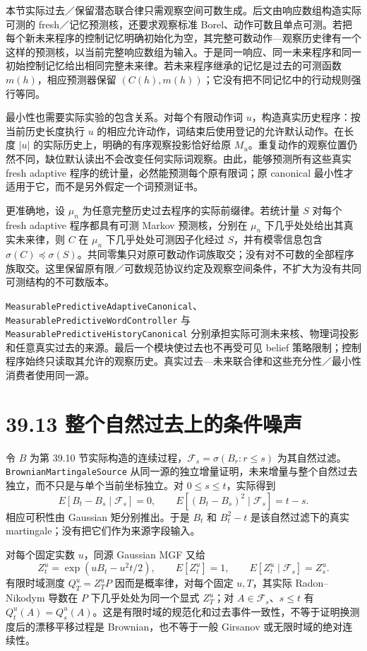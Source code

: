 \documentclass[
  11pt,
  oneside]{book}
\begin{document}
本节实际过去／保留潜态联合律只需观察空间可数生成。后文由响应数组构造实际可测的 fresh／记忆预测核，还要求观察标准 Borel、动作可数且单点可测。若把每个新未来程序的控制记忆明确初始化为空，其完整可数动作---观察历史律有一个这样的预测核，以当前完整响应数组为输入。于是同一响应、同一未来程序和同一初始控制记忆给出相同完整未来律。若未来程序继承的记忆是过去的可测函数 \(m(h)\)，相应预测器保留 \((C(h),m(h))\)；它没有把不同记忆中的行动规则强行等同。

最小性也需要实际实验的包含关系。对每个有限动作词 \(u\)，构造真实历史程序：按当前历史长度执行 \(u\) 的相应允许动作，词结束后使用登记的允许默认动作。在长度 \(|u|\) 的实际历史上，明确的有序观察投影恰好给原 \(M_u\)。重复动作的观察位置仍然不同，缺位默认读出不会改变任何实际词观察。由此，能够预测所有这些真实 fresh adaptive 程序的统计量，必然能预测每个原有限词；原 canonical 最小性才适用于它，而不是另外假定一个词预测证书。

更准确地，设 \(\mu_n\) 为任意完整历史过去程序的实际前缀律。若统计量 \(S\) 对每个 fresh adaptive 程序都具有可测 Markov 预测核，分别在 \(\mu_n\) 下几乎处处给出其真实未来律，则 \(C\) 在 \(\mu_n\) 下几乎处处可测因子化经过 \(S\)，并有模零信息包含 \(\sigma(C)\preceq\sigma(S)\)。共同零集只对原可数动作词族取交；没有对不可数的全部程序族取交。这里保留原有限／可数规范协议约定及观察空间条件，不扩大为没有共同可测结构的不可数版本。

\nolinkurl{MeasurablePredictiveAdaptiveCanonical}、\nolinkurl{MeasurablePredictiveWordController} 与 \nolinkurl{MeasurablePredictiveHistoryCanonical} 分别承担实际可测未来核、物理词投影和任意真实过去的来源。最后一个模块使过去也不再受可见 belief 策略限制；控制程序始终只读取其允许的观察历史。真实过去---未来联合律和这些充分性／最小性消费者使用同一源。

\section{39.13 整个自然过去上的条件噪声}\label{ux6574ux4e2aux81eaux7136ux8fc7ux53bbux4e0aux7684ux6761ux4ef6ux566aux58f0}

令 \(B\) 为第 39.10 节实际构造的连续过程，\(\mathcal F_s=\sigma(B_r:r\le s)\) 为其自然过滤。\nolinkurl{BrownianMartingaleSource} 从同一源的独立增量证明，未来增量与整个自然过去独立，而不只是与单个当前坐标独立。对 \(0\le s\le t\)，实际得到 \[E[B_t-B_s\mid\mathcal F_s]=0,\qquad
E[(B_t-B_s)^2\mid\mathcal F_s]=t-s.\] 相应可积性由 Gaussian 矩分别推出。于是 \(B_t\) 和 \(B_t^2-t\) 是该自然过滤下的真实 martingale；没有把它们作为来源字段输入。

对每个固定实数 \(u\)，同源 Gaussian MGF 又给 \[Z_t^u=\exp(uB_t-u^2t/2),\qquad E[Z_t^u]=1,
\qquad E[Z_t^u\mid\mathcal F_s]=Z_s^u.\] 有限时域测度 \(Q_T^u=Z_T^uP\) 因而是概率律，对每个固定 \(u,T\)，其实际 Radon--Nikodym 导数在 \(P\) 下几乎处处为同一个显式 \(Z_T^u\)；对 \(A\in\mathcal F_s\)、\(s\le t\) 有 \(Q_t^u(A)=Q_s^u(A)\)。这是有限时域的规范化和过去事件一致性，不等于证明换测度后的漂移平移过程是 Brownian，也不等于一般 Girsanov 或无限时域的绝对连续性。
\end{document}
